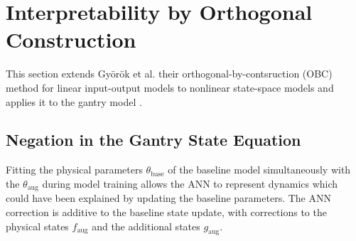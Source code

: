 \section{Interpretability by Orthogonal Construction}\label{sec:obc}

This section extends Gy\"or\"ok et al. their orthogonal-by-contsruction (OBC) method for linear input-output models
to nonlinear state-space models and applies it to the gantry model . 

\subsection{Negation in the Gantry State Equation}\label{sec:obc_negation}
Fitting the physical parameters $\theta_{\mathrm{base}}$ of the baseline model simultaneously with the  $\theta_{\mathrm{aug}}$ during model training allows the ANN to represent dynamics 
which could have been explained by updating the baseline parameters. The ANN correction is additive to the baseline state update,
with corrections to the physical states $f_{\mathrm{aug}}$ and the additional states $g_{\mathrm{aug}}$.



